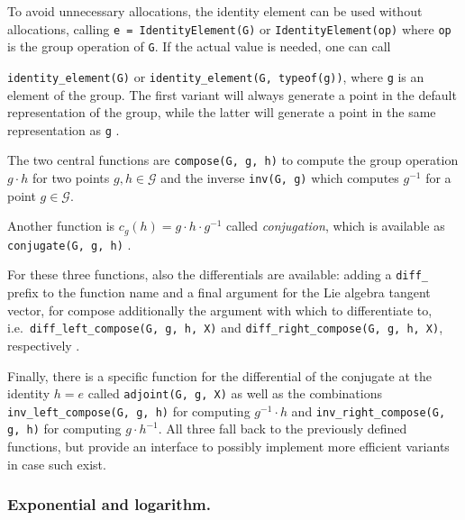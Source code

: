 \documentclass{juliacon}
\newcommand{\term}[1]{\emph{#1}}
\begin{document}
To avoid unnecessary allocations, the identity element can be used without allocations, calling \verb|e = IdentityElement(G)| or \verb|IdentityElement(op)| where \verb|op| is the group operation of \verb|G|. If the actual value is needed, one can call

\verb|identity_element(G)| or \verb|identity_element(G, typeof(g))|, where \verb|g| is an element of the group. The first variant will always generate a point in the default representation of the group, while the latter will generate a point in the same representation as \verb|g|%
.

The two central functions are \verb|compose(G, g, h)|
to compute the group operation \(g \cdot h\) for two points \(g, h \in \mathcal{G}\) and the inverse \verb|inv(G, g)|
which computes \(g^{-1}\) for a point \(g \in \mathcal{G}\).

Another function is $c_g(h) = g \cdot h \cdot g^{-1}$ called \term{conjugation}, which is available as \verb|conjugate(G, g, h)|%
.

For these three functions, also the differentials are available: adding a \verb|diff_| prefix to the function name and a final argument for the Lie algebra tangent vector, for compose additionally the argument with which to  differentiate to, i.e.\ \verb|diff_left_compose(G, g, h, X)| and \verb|diff_right_compose(G, g, h, X)|, respectively%
.

Finally, there is a specific function for the differential of the conjugate at the identity $h=e$ called \verb|adjoint(G, g, X)|
as well as the combinations \verb|inv_left_compose(G, g, h)|
for computing $g^{-1}\cdot h$ and \verb|inv_right_compose(G, g, h)|
for computing $g \cdot h^{-1}$. All three fall back to the previously defined functions, but provide an interface to possibly implement more efficient variants in case such exist.

\subsubsection*{Exponential and logarithm.}
\end{document}
